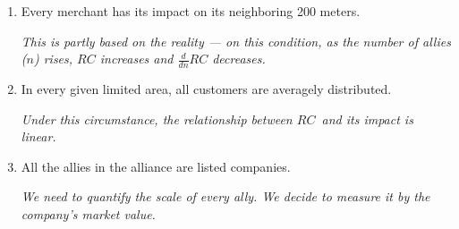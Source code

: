\begin{enumerate}
\item
Every merchant has its impact on its neighboring 200 meters.

\textsl{
This is partly based on the reality --- on this condition, as the number of allies ($n$) rises, $RC$ increases and $\frac{d}{dn} RC$ decreases.
}

\item
In every given limited area, all customers are averagely distributed.

\textsl{
Under this circumstance, the relationship between $RC$\ and its impact is linear.
}

\item
All the allies in the alliance are listed companies.

\textsl{
We need to quantify the scale of every ally. We decide to measure it by the company's market value. 
}
\end{enumerate}